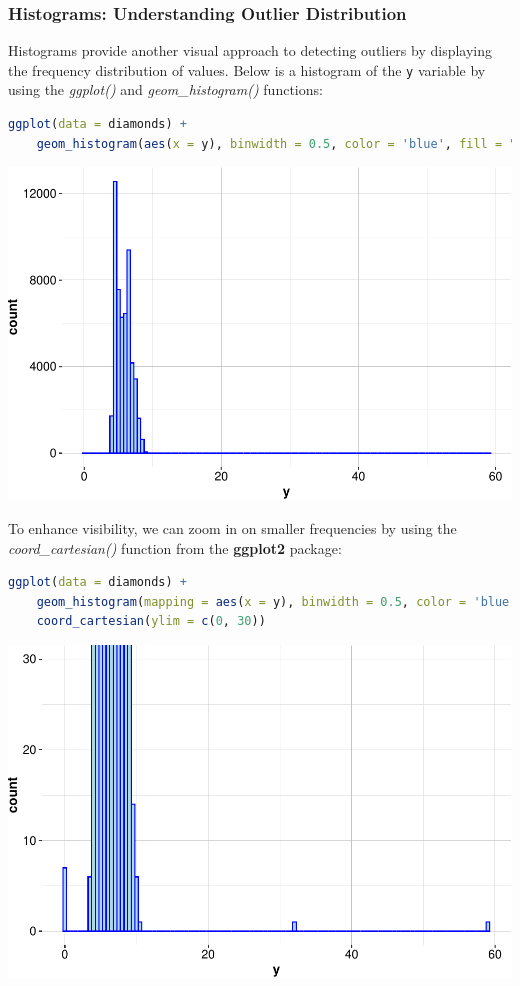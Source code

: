 \documentclass[
]{book}
\newcommand{\passthrough}[1]{#1}
\theoremstyle{definition}
\theoremstyle{definition}
\theoremstyle{definition}
\theoremstyle{definition}
\theoremstyle{remark}
\begin{document}
\subsubsection*{Histograms: Understanding Outlier Distribution}\label{histograms-understanding-outlier-distribution}

Histograms provide another visual approach to detecting outliers by displaying the frequency distribution of values. Below is a histogram of the \passthrough{\lstinline!y!} variable by using the \emph{ggplot()} and \emph{geom\_histogram()} functions:

\begin{lstlisting}[language=R]
ggplot(data = diamonds) +
    geom_histogram(aes(x = y), binwidth = 0.5, color = 'blue', fill = "lightblue")
\end{lstlisting}

\begin{center}\includegraphics[width=0.7\linewidth]{data-preparation_files/figure-latex/unnamed-chunk-5-1} \end{center}

To enhance visibility, we can zoom in on smaller frequencies by using the \emph{coord\_cartesian()} function from the \textbf{ggplot2} package:

\begin{lstlisting}[language=R]
ggplot(data = diamonds) +
    geom_histogram(mapping = aes(x = y), binwidth = 0.5, color = 'blue', fill = "lightblue") + 
    coord_cartesian(ylim = c(0, 30))
\end{lstlisting}

\begin{center}\includegraphics[width=0.7\linewidth]{data-preparation_files/figure-latex/unnamed-chunk-6-1} \end{center}
\end{document}
